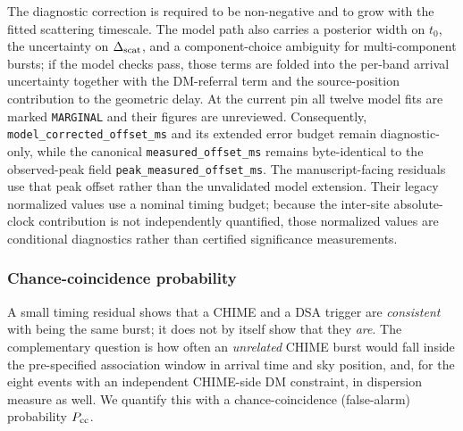 The diagnostic correction is required to be non-negative and to grow with the
fitted scattering timescale. The model path also carries a posterior width on
$t_0$, the uncertainty on $\Delta_{\rm scat}$, and a component-choice ambiguity
for multi-component bursts; if the model checks pass, those terms are folded
into the per-band arrival uncertainty together with the DM-referral term and the
source-position contribution to the geometric delay. At the current pin all
twelve model fits are marked \texttt{MARGINAL} and their figures are unreviewed.
Consequently, \texttt{model\_corrected\_offset\_ms} and its extended error
budget remain diagnostic-only, while the canonical
\texttt{measured\_offset\_ms} remains byte-identical to the observed-peak field
\texttt{peak\_measured\_offset\_ms}. The manuscript-facing residuals use that
peak offset rather than the unvalidated model extension. Their legacy
normalized values use a nominal timing budget; because the inter-site
absolute-clock contribution is not independently quantified, those normalized
values are conditional diagnostics rather than certified significance
measurements.

\subsubsection{Chance-coincidence probability}
\label{sec:toa-pcc}

A small timing residual shows that a CHIME and a DSA trigger are \emph{consistent}
with being the same burst; it does not by itself show that they \emph{are}. The
complementary question is how often an \emph{unrelated} CHIME burst would fall
inside the pre-specified association window in arrival time and sky position,
and, for the eight events with an independent CHIME-side DM constraint, in
dispersion measure as well. We quantify this with a chance-coincidence
(false-alarm) probability $P_{\rm cc}$.


